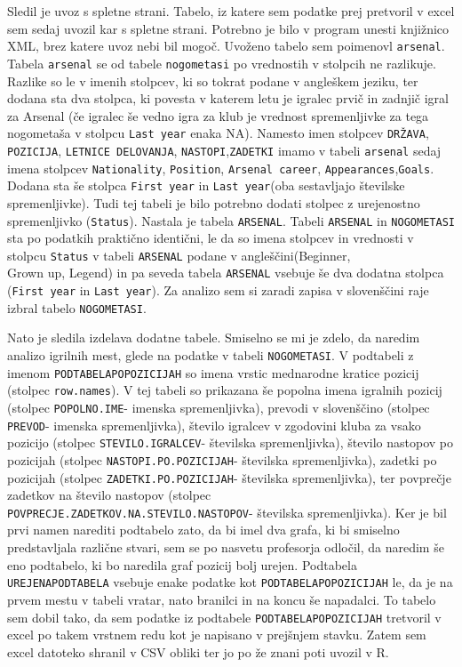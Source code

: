 \documentclass[11pt,a4paper]{article}
\begin{document}
Sledil je uvoz s spletne strani. Tabelo, iz katere sem podatke prej pretvoril v excel sem sedaj uvozil kar s spletne strani. Potrebno je bilo v program unesti knjižnico XML, brez katere uvoz nebi bil mogoč. Uvoženo tabelo sem poimenovl \verb|arsenal|. Tabela \verb|arsenal| se od tabele \verb|nogometasi| po vrednostih v stolpcih ne razlikuje. Razlike so le v imenih stolpcev, ki so tokrat podane v angleškem jeziku, ter dodana sta dva stolpca, ki povesta v katerem letu je igralec prvič in zadnjič igral za Arsenal (če igralec še vedno igra za klub je vrednost spremenljivke za tega nogometaša v stolpcu \verb|Last year| enaka NA). Namesto imen stolpcev \verb|DRŽAVA|, \verb|POZICIJA|, \verb|LETNICE DELOVANJA|, \verb|NASTOPI|,\verb|ZADETKI| imamo v tabeli \verb|arsenal| sedaj imena stolpcev \verb|Nationality|, \verb|Position|, \verb|Arsenal career|, \verb|Appearances|,\verb|Goals|. Dodana sta še stolpca \verb|First year| in \verb|Last year|(oba sestavljajo številske spremenljivke). Tudi tej tabeli je bilo potrebno dodati stolpec z urejenostno spremenljivko (\verb|Status|). Nastala je tabela \verb|ARSENAL|. Tabeli \verb|ARSENAL| in \verb|NOGOMETASI| sta po podatkih praktično identični, le da so imena stolpcev in vrednosti v stolpcu  \verb|Status| v tabeli \verb|ARSENAL| podane v angleščini(Beginner,\\ Grown up, Legend) in pa seveda tabela \verb|ARSENAL| vsebuje še dva dodatna stolpca (\verb|First year| in \verb|Last year|). Za analizo sem si zaradi zapisa v slovenščini raje izbral tabelo \verb|NOGOMETASI|.

Nato je sledila izdelava dodatne tabele. Smiselno se mi je zdelo, da naredim analizo igrilnih mest, glede na podatke v tabeli \verb|NOGOMETASI|. V podtabeli z imenom \verb|PODTABELAPOPOZICIJAH| so imena vrstic mednarodne kratice pozicij (stolpec \verb|row.names|). V tej tabeli so prikazana še popolna imena igralnih pozicij (stolpec \verb|POPOLNO.IME|- imenska spremenljivka), prevodi v slovenščino (stolpec \verb|PREVOD|- imenska spremenljivka), število igralcev v zgodovini kluba za vsako pozicijo (stolpec \verb|STEVILO.IGRALCEV|- številska spremenljivka), število nastopov po pozicijah (stolpec \verb|NASTOPI.PO.POZICIJAH|- številska spremenljivka), zadetki po pozicijah (stolpec \texttt{ZADETKI.PO.POZI\-CI\-JAH}- številska spremenljivka), ter povprečje zadetkov na število nastopov (stolpec \verb|POVPRECJE.ZADETKOV.NA.STEVILO.NASTOPOV|- številska spremenljivka). Ker je bil prvi namen narediti podtabelo zato, da bi imel dva grafa, ki bi smiselno predstavljala različne stvari, sem se po nasvetu profesorja odločil, da naredim še eno podtabelo, ki bo naredila graf pozicij bolj urejen. Podtabela \verb|UREJENAPODTABELA| vsebuje enake podatke kot \verb|PODTABELAPOPOZICIJAH| le, da je na prvem mestu v tabeli vratar, nato branilci in na koncu še napadalci. To tabelo sem dobil tako, da sem podatke iz podtabele \verb|PODTABELAPOPOZICIJAH| tretvoril v excel po takem vrstnem redu kot je napisano v prejšnjem stavku. Zatem sem excel datoteko shranil v CSV obliki ter jo po že znani poti uvozil v R.
\end{document}
